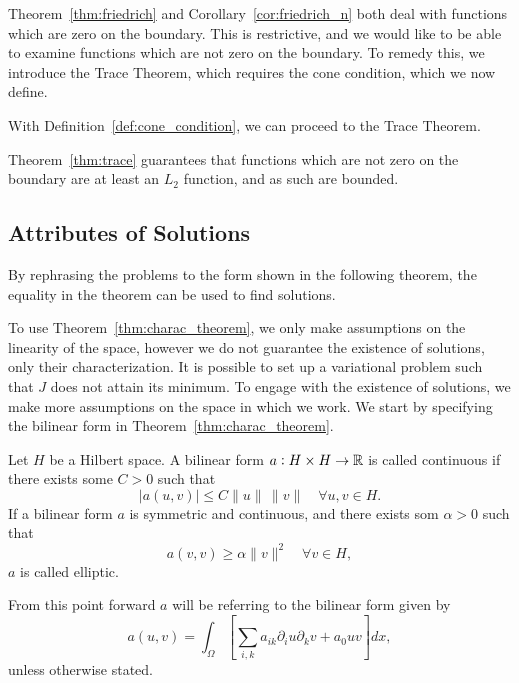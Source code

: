 
Theorem~\ref{thm:friedrich} and Corollary~\ref{cor:friedrich_n} both deal with 
functions which are zero on the boundary. 
This is restrictive, and we would like to be able to examine 
functions which are not zero on the boundary.
To remedy this, we introduce the Trace Theorem, which requires the cone condition, which we now define.

With Definition~\ref{def:cone_condition}, we can proceed to the Trace Theorem.

Theorem~\ref{thm:trace} guarantees that functions which are not 
zero on the boundary are at least an $L_2$ function, and as such are bounded. %
\subsection{Attributes of Solutions}
By rephrasing the problems to the form shown in the 
following theorem,
the equality in the theorem can be used to find solutions. %

To use Theorem~\ref{thm:charac_theorem}, we
only make assumptions on the linearity of the space, however we
do not guarantee the existence  of solutions, only their characterization.
It is possible to set up a variational problem such that $J$ does 
not attain its minimum.
To engage with the existence of solutions, we make more assumptions on 
the space in which we work.
We start by specifying the bilinear form in Theorem~\ref{thm:charac_theorem}.
\begin{defn}{\quad}
   Let $H$ be a Hilbert space. A bilinear form $a : H \times H \to \mathbb{R}$ is 
   called continuous if there exists some $C > 0$ such that 
   \begin{equation}
    |a(u,v)| \leq C \|u\|\, \|v\| \quad \forall u,v \in H.
   \end{equation} 
   If a bilinear form $a$ is symmetric and continuous, and there exists som $\alpha >0$ such that 
   \begin{equation*}
    a(v,v) \geq \alpha \|v\|^2 \quad \forall v \in H,
   \end{equation*}
   $a$ is called elliptic.\label{def:elliptic}
 \end{defn}
From this point forward $a$ will be referring to the bilinear form given by
\begin{equation}
   a(u,v) = \int_\Omega \left[\sum_{i,k} a_{ik}\partial_i u\partial_k v+a_0uv\right]dx,
\end{equation}
unless otherwise stated.

